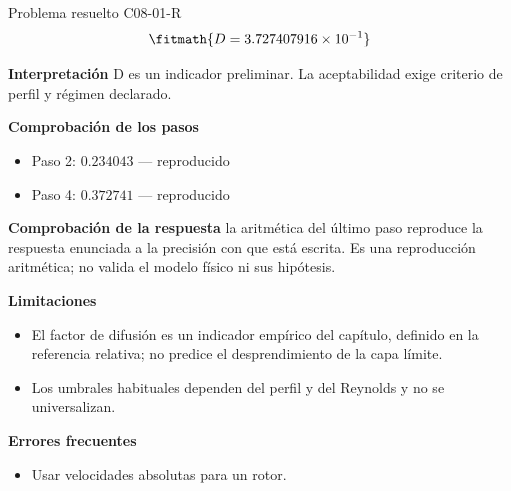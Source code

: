 \documentclass[10pt,openany]{book}
\begin{document}
\begin{studiumworked}{Problema resuelto C08-01-R}
\[
\fitmath{D=3.727407916\times10^{-1}}
\]

\noindent\textbf{Interpretación}
D es un indicador preliminar. La aceptabilidad exige criterio de perfil y régimen declarado.

\noindent\textbf{Comprobación de los pasos}
\begin{itemize}
\item Paso 2: $0.234043$ — reproducido
\item Paso 4: $0.372741$ — reproducido
\end{itemize}

\noindent\textbf{Comprobación de la respuesta} la aritmética del último paso reproduce la respuesta enunciada a la precisión con que está escrita. Es una reproducción aritmética; no valida el modelo físico ni sus hipótesis.

\noindent\textbf{Limitaciones}
\begin{itemize}
\item El factor de difusión es un indicador empírico del capítulo, definido en la referencia relativa; no predice el desprendimiento de la capa límite.
\item Los umbrales habituales dependen del perfil y del Reynolds y no se universalizan.
\end{itemize}

\noindent\textbf{Errores frecuentes}
\begin{itemize}
\item Usar velocidades absolutas para un rotor.
\end{itemize}
\end{studiumworked}
\end{document}
